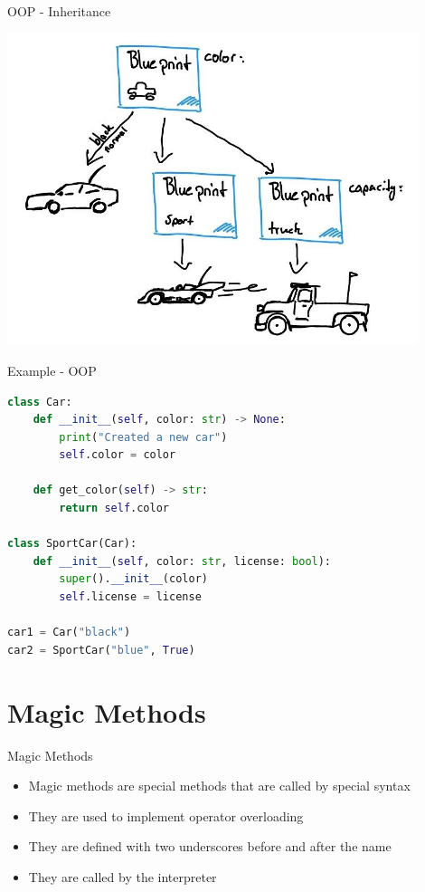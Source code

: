 \documentclass{beamer}
\begin{document}
\begin{frame}{OOP - Inheritance}
    \begin{center}
        \includegraphics[width=0.9\textwidth]{figures/full_inheritance.jpg}
    \end{center}
\end{frame}

\begin{frame}[fragile]{Example - OOP}
    \begin{lstlisting}[language=Python]
class Car:
    def __init__(self, color: str) -> None:
        print("Created a new car")
        self.color = color

    def get_color(self) -> str:
        return self.color
        
class SportCar(Car):
    def __init__(self, color: str, license: bool):
        super().__init__(color)
        self.license = license
        
car1 = Car("black")
car2 = SportCar("blue", True)
    \end{lstlisting}
\end{frame}

\section{Magic Methods}
\begin{frame}{Magic Methods}
    \begin{itemize}
        \item Magic methods are special methods that are called by special syntax
        \item They are used to implement operator overloading
        \item They are defined with two underscores before and after the name
        \item They are called by the interpreter
    \end{itemize}
\end{frame}
\end{document}
